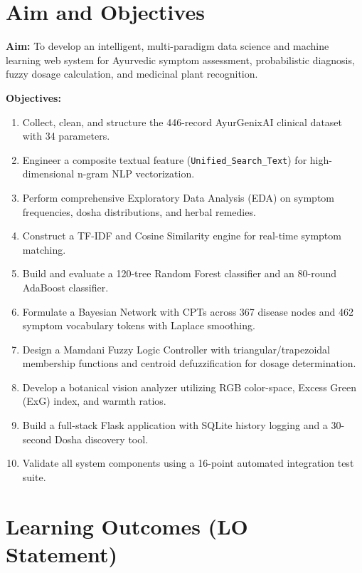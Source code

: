 \documentclass[12pt,a4paper]{article}
\begin{document}
\section{Aim and Objectives}

\textbf{Aim:} To develop an intelligent, multi-paradigm data science and machine learning web system for Ayurvedic symptom assessment, probabilistic diagnosis, fuzzy dosage calculation, and medicinal plant recognition.

\textbf{Objectives:}
\begin{enumerate}
    \item Collect, clean, and structure the 446-record AyurGenixAI clinical dataset with 34 parameters.
    \item Engineer a composite textual feature (\texttt{Unified\_Search\_Text}) for high-dimensional n-gram NLP vectorization.
    \item Perform comprehensive Exploratory Data Analysis (EDA) on symptom frequencies, dosha distributions, and herbal remedies.
    \item Construct a TF-IDF and Cosine Similarity engine for real-time symptom matching.
    \item Build and evaluate a 120-tree Random Forest classifier and an 80-round AdaBoost classifier.
    \item Formulate a Bayesian Network with CPTs across 367 disease nodes and 462 symptom vocabulary tokens with Laplace smoothing.
    \item Design a Mamdani Fuzzy Logic Controller with triangular/trapezoidal membership functions and centroid defuzzification for dosage determination.
    \item Develop a botanical vision analyzer utilizing RGB color-space, Excess Green (ExG) index, and warmth ratios.
    \item Build a full-stack Flask application with SQLite history logging and a 30-second Dosha discovery tool.
    \item Validate all system components using a 16-point automated integration test suite.
\end{enumerate}

\section{Learning Outcomes (LO Statement)}
\end{document}
